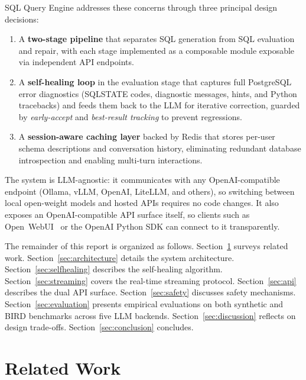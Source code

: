 \documentclass{article}
\begin{document}
SQL Query Engine addresses these concerns through three principal design decisions:

\begin{enumerate}[leftmargin=1.5em]
  \item A \textbf{two-stage pipeline} that separates SQL generation from SQL evaluation and repair, with each stage implemented as a composable module exposable via independent API endpoints.
  \item A \textbf{self-healing loop} in the evaluation stage that captures full PostgreSQL error diagnostics (SQLSTATE codes, diagnostic messages, hints, and Python tracebacks) and feeds them back to the LLM for iterative correction, guarded by \emph{early-accept} and \emph{best-result tracking} to prevent regressions.
  \item A \textbf{session-aware caching layer} backed by Redis that stores per-user schema descriptions and conversation history, eliminating redundant database introspection and enabling multi-turn interactions.
\end{enumerate}

The system is LLM-agnostic: it communicates with any OpenAI-compatible endpoint (Ollama, vLLM, OpenAI, LiteLLM, and others), so switching between local open-weight models and hosted APIs requires no code changes. It also exposes an OpenAI-compatible API surface itself, so clients such as Open~WebUI~\citep{openwebui2024} or the OpenAI Python SDK can connect to it transparently.

The remainder of this report is organized as follows. Section~\ref{sec:related} surveys related work. Section~\ref{sec:architecture} details the system architecture. Section~\ref{sec:selfhealing} describes the self-healing algorithm. Section~\ref{sec:streaming} covers the real-time streaming protocol. Section~\ref{sec:api} describes the dual API surface. Section~\ref{sec:safety} discusses safety mechanisms. Section~\ref{sec:evaluation} presents empirical evaluations on both synthetic and BIRD benchmarks across five LLM backends. Section~\ref{sec:discussion} reflects on design trade-offs. Section~\ref{sec:conclusion} concludes.


\section{Related Work}
\label{sec:related}
\end{document}
